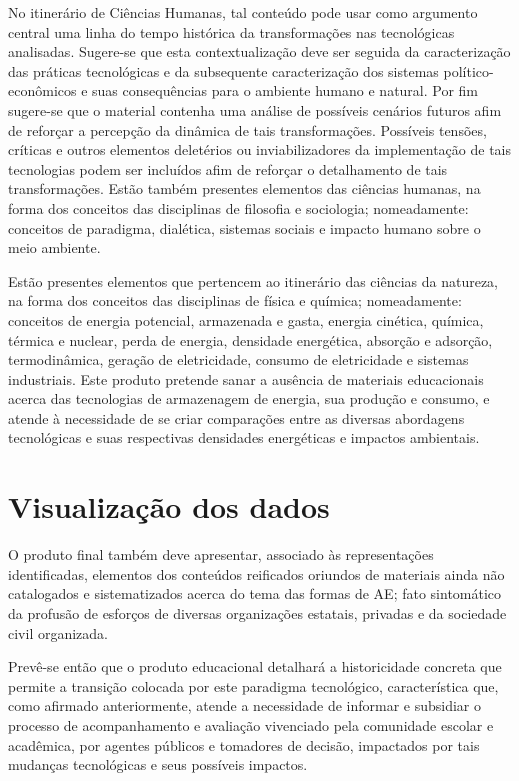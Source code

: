 \documentclass[
  12pt,       %
  openright,      %
  twoside,      %
  a4paper,      %
  english,      %
  french,       %
  spanish,      %
  brazil        %
  ]{abntex2}
\begin{document}
No itinerário de Ciências Humanas, tal conteúdo pode usar como argumento central uma linha do tempo histórica da transformações nas tecnológicas analisadas. Sugere-se que esta contextualização deve ser seguida da caracterização das práticas tecnológicas e da subsequente caracterização dos sistemas político-econômicos e suas consequências para o ambiente humano e natural. Por fim sugere-se que o material contenha uma análise de possíveis cenários futuros afim de reforçar a percepção da dinâmica de tais transformações. Possíveis tensões, críticas e outros elementos deletérios ou inviabilizadores da implementação de tais tecnologias podem ser incluídos afim de reforçar o detalhamento de tais transformações. Estão também presentes elementos das ciências humanas, na forma dos conceitos das disciplinas de filosofia e sociologia; nomeadamente: conceitos de paradigma, dialética, sistemas sociais e impacto humano sobre o meio ambiente.

Estão presentes elementos que pertencem ao itinerário das ciências da natureza, na forma dos conceitos das disciplinas de física e química; nomeadamente: conceitos de energia potencial, armazenada e gasta, energia cinética, química, térmica e nuclear, perda de energia, densidade energética, absorção e adsorção, termodinâmica, geração de eletricidade, consumo de eletricidade e sistemas industriais. Este produto pretende sanar a ausência de materiais educacionais acerca das tecnologias de armazenagem de energia, sua produção e consumo, e atende à necessidade de se criar comparações entre as diversas abordagens tecnológicas e suas respectivas densidades energéticas e impactos ambientais.

\section{Visualização dos dados}

O produto final também deve apresentar, associado às representações identificadas, elementos dos conteúdos reificados oriundos de materiais ainda não catalogados e sistematizados acerca do tema das formas de AE; fato sintomático da profusão de esforços de diversas organizações estatais, privadas e da sociedade civil organizada.

Prevê-se então que o produto educacional detalhará a historicidade concreta que permite a transição colocada por este paradigma tecnológico, característica que, como afirmado anteriormente, atende a necessidade de informar e subsidiar o processo de acompanhamento e avaliação vivenciado pela comunidade escolar e acadêmica, por agentes públicos e tomadores de decisão, impactados por tais mudanças tecnológicas e seus possíveis impactos.
\end{document}

